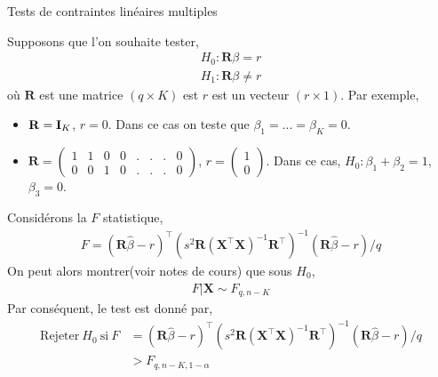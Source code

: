 \begin{frame}[allowframebreaks]{Tests de contraintes linéaires multiples}

Supposons que l'on souhaite tester,
\begin{align*}
H_0: \mathbf{R}\beta = r\\
H_1: \mathbf{R}\beta \neq r
\end{align*}
où $\mathbf{R}$ est une matrice $(q \times K)$ est $r$ est un vecteur $(r\times 1)$. Par exemple, 
\begin{itemize}
\item $\mathbf{R} = \mathbf{I}_K$, $r=0$. Dans ce cas on teste que $\beta_1=...=\beta_K=0$.
\item $\mathbf{R} = \left(
\begin{array}{cccccccc}
1&1&0&0&.&.&.&0\\
0&0&1&0&.&.&.&0
\end{array}
\right)$, $r = \left(\begin{array}{c}
1\\
0
\end{array}
\right)
$. Dans ce cas, $H_0: \beta_1 + \beta_2 = 1$, $\beta_3=0$.
\end{itemize}

Considérons la $F$ statistique,
\begin{align*}
F = \left(\mathbf{R}\widehat{\beta} - r\right)^\top\left(s^2\mathbf{R}(\mathbf{X}^\top\mathbf{X})^{-1}\mathbf{R}^\top\right)^{-1}\left(\mathbf{R}\widehat{\beta} - r\right)/q
\end{align*}
On peut alors montrer(voir notes de cours) que sous $H_0$,
\begin{align}
F | \mathbf{X} \sim F_{q, n-K}
\label{eq43}
\end{align}
 Par conséquent, le test est donné par,
\begin{align*}
\textrm{Rejeter} \ H_0 \ \textrm{si} \ F &= \left(\mathbf{R}\widehat{\beta} - r\right)^\top\left(s^2\mathbf{R}(\mathbf{X}^\top\mathbf{X})^{-1}\mathbf{R}^\top\right)^{-1}\left(\mathbf{R}\widehat{\beta} - r\right)/q\\
&> F_{q, n-K, 1-\alpha} 
\end{align*}
\end{frame}



%
%



%
%


